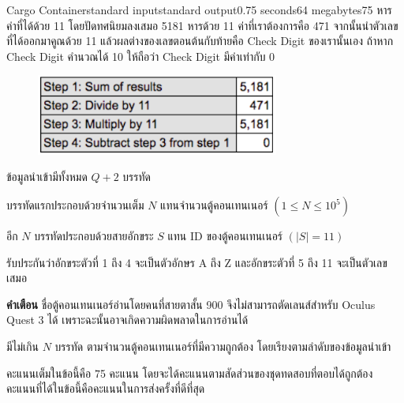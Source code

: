 \documentclass[11pt,a4paper]{article}
\begin{document}
\begin{problem}{Cargo Container}{standard input}{standard output}{0.75 seconds}{64 megabytes}{75}
หารค่าที่ได้ด้วย 11 โดยปัดทศนิยมลงเสมอ 5181 หารด้วย 11 ค่าที่เราต้องการคือ 471 จากนั้นนำตัวเลขที่ได้ออกมาคูณด้วย 11 แล้วผลต่างของเลขตอนต้นกับท้ายคือ Check Digit ของเรานั้นเอง ถ้าหาก Check Digit คำนวณได้ 10 ให้ถือว่า Check Digit มีค่าเท่ากับ 0

\begin{figure}[htp]
    \centering
    \includegraphics[width=8cm]{cargocontainercheck/final.png}
\end{figure}

\InputFile


ข้อมูลนำเข้ามีทั้งหมด $Q+2$ บรรทัด

บรรทัดแรกประกอบด้วยจำนวนเต็ม $N$ แทนจำนวนตู้คอนเทนเนอร์ $(1\leq N\leq 10^{5})$

อีก $N$ บรรทัดประกอบด้วยสายอักขระ $S$ แทน ID ของตู้คอนเทนเนอร์ $(|S|=11)$

รับประกันว่าอักขระตัวที่ 1 ถึง 4 จะเป็นตัวอักษร A ถึง Z และอักขระตัวที่ 5 ถึง 11 จะเป็นตัวเลขเสมอ

\textbf{คำเตือน} ชื่อตู้คอนเทนเนอร์อ่านโดยคนที่สายตาสั้น 900 จึงไม่สามารถตัดเลนส์สำหรับ Oculus Quest 3 ได้ เพราะฉะนั้นอาจเกิดความผิดพลาดในการอ่านได้

\OutputFile
มีไม่เกิน $N$ บรรทัด ตามจำนวนตู้คอนเทนเนอร์ที่มีความถูกต้อง โดยเรียงตามลำดับของข้อมูลนำเข้า

\Scoring
คะแนนเต็มในข้อนี้คือ 75 คะแนน โดยจะได้คะแนนตามสัดส่วนของชุดทดสอบที่ตอบได้ถูกต้อง คะแนนที่ได้ในข้อนี้คือคะแนนในการส่งครั้งที่ดีที่สุด

\Examples

\begin{example}
%
\end{example}

\end{problem}
\end{document}
